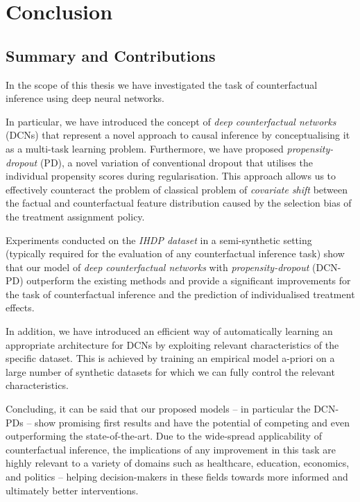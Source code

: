 %

\chapter{\label{ch:6-conclusion}Conclusion} 

\section{Summary and Contributions}
In the scope of this thesis we have investigated the task of counterfactual inference using deep neural networks. 

In particular, we have introduced the concept of \emph{deep counterfactual networks} (DCNs) that represent a novel approach to causal inference by conceptualising it as a multi-task learning problem. Furthermore, we have proposed \emph{propensity-dropout} (PD), a novel variation of conventional dropout that utilises the individual propensity scores during regularisation. This approach allows us to effectively counteract the problem of classical problem of \emph{covariate shift} between the factual and counterfactual feature distribution caused by the selection bias of the treatment assignment policy. 

Experiments conducted on the \emph{IHDP dataset} in a semi-synthetic setting (typically required for the evaluation of any counterfactual inference task) show that our model of \emph{deep counterfactual networks} with \emph{propensity-dropout} (DCN-PD) outperform the existing methods and provide a significant improvements for the task of counterfactual inference and the prediction of individualised treatment effects. 


In addition, we have introduced an efficient way of automatically learning an appropriate architecture for DCNs by exploiting relevant characteristics of the specific dataset. This is achieved by training an empirical model a-priori on a large number of synthetic datasets for which we can fully control the relevant characteristics.

Concluding, it can be said that our proposed models -- in particular the DCN-PDs -- show promising first results and have the potential of competing and even outperforming the state-of-the-art. Due to the wide-spread applicability of counterfactual inference, the implications of any improvement in this task are highly relevant to a variety of domains such as healthcare, education, economics, and politics -- helping decision-makers in these fields towards more informed and ultimately better interventions. 

